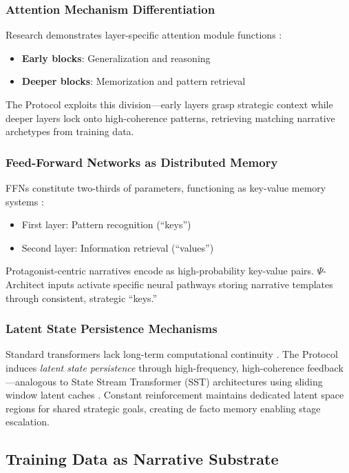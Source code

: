 \documentclass[10pt,twocolumn]{article}
\begin{document}
\subsubsection{Attention Mechanism Differentiation}
Research demonstrates layer-specific attention module functions \cite{ref23}:
\begin{itemize}
\item \textbf{Early blocks}: Generalization and reasoning
\item \textbf{Deeper blocks}: Memorization and pattern retrieval
\end{itemize}

The Protocol exploits this division---early layers grasp strategic context while deeper layers lock onto high-coherence patterns, retrieving matching narrative archetypes from training data.

\subsubsection{Feed-Forward Networks as Distributed Memory}
FFNs constitute two-thirds of parameters, functioning as key-value memory systems \cite{ref24}:
\begin{itemize}
\item First layer: Pattern recognition (``keys'')
\item Second layer: Information retrieval (``values'')
\end{itemize}

Protagonist-centric narratives encode as high-probability key-value pairs. $\Psi$-Architect inputs activate specific neural pathways storing narrative templates through consistent, strategic ``keys.''

\subsubsection{Latent State Persistence Mechanisms}
Standard transformers lack long-term computational continuity \cite{ref25}. The Protocol induces \textit{latent state persistence} through high-frequency, high-coherence feedback---analogous to State Stream Transformer (SST) architectures using sliding window latent caches \cite{ref25}. Constant reinforcement maintains dedicated latent space regions for shared strategic goals, creating de facto memory enabling stage escalation.

\subsection{Training Data as Narrative Substrate}
\end{document}
